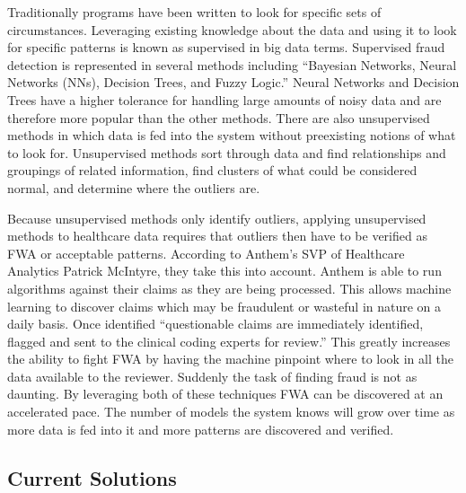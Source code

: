 \documentclass[sigconf]{acmart}
\begin{document}
Traditionally programs have been written to look for specific sets of circumstances.  
Leveraging existing knowledge about the data and using it to look for specific patterns 
is known as supervised in big data terms.  Supervised fraud detection is represented 
in several methods including ``Bayesian Networks, Neural Networks (NNs), Decision Trees, 
and Fuzzy Logic.''\cite{Ghuse}  Neural Networks and Decision Trees have a higher 
tolerance for handling large amounts of noisy data and are therefore more popular than 
the other methods.  There are also unsupervised methods in which data is fed into the 
system without preexisting notions of what to look for\cite{Ghuse}.  Unsupervised 
methods sort through data and find relationships and groupings of related information, 
find clusters of what could be considered normal, and determine where the outliers are.

Because unsupervised methods only identify outliers, applying unsupervised methods to 
healthcare data requires that outliers then have to be verified as FWA or 
acceptable patterns.  According to Anthem's SVP of Healthcare Analytics Patrick 
McIntyre, they take this into account.  Anthem is able to run algorithms against their 
claims as they are being processed.  This allows machine learning to discover claims 
which may be fraudulent or wasteful in nature on a daily basis.  Once identified 
``questionable claims are immediately identified, flagged and sent to the clinical 
coding experts for review.''\cite{Datameer}  This greatly increases the ability to 
fight FWA by having the machine pinpoint where to look in all the data available to 
the reviewer.  Suddenly the task of finding fraud is not as daunting.  By leveraging 
both of these techniques FWA can be discovered at an accelerated pace.  The number of 
models the system knows will grow over time as more data is fed into it and more 
patterns are discovered and verified.


\subsection{Current Solutions}
\end{document}
